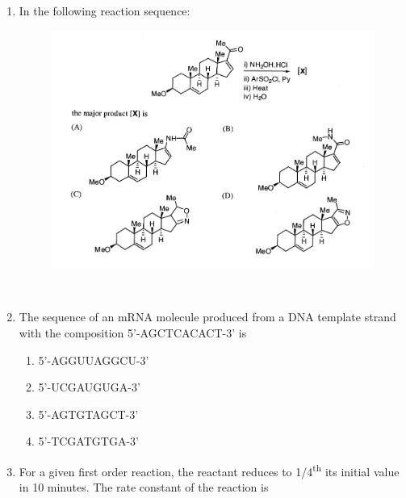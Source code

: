 \documentclass[journal,12pt,onecolumn]{IEEEtran}
\theoremstyle{remark}
\begin{document}
\begin{enumerate}
 

\newpage
\item    In the following reaction sequence: \hfill{}
 


\begin{figure}[H][H]
    \centering
    \includegraphics[width=1\columnwidth]{figs/image4.jpg}
    \caption{}
    \label{fig:figure4}
\end{figure}

 

\newpage
\

\item    \hspace{0.5cm} The sequence of an mRNA molecule produced from a DNA template strand with the composition 5'-AGCTCACACT-3' is  \hfill{}

\begin{multicols}{2}
\begin{enumerate}
    \item 5'-AGGUUAGGCU-3'
    \item 5'-UCGAUGUGA-3'
    \item 5'-AGTGTAGCT-3'
    \item 5'-TCGATGTGA-3'
\end{enumerate}
\end{multicols}
 




\item    \hspace{0.5cm} For a given first order reaction, the reactant reduces to 1/4\textsuperscript{th} its initial value in 10 minutes. The rate constant of the reaction is  \hfill{}


\end{enumerate}
\end{document}
